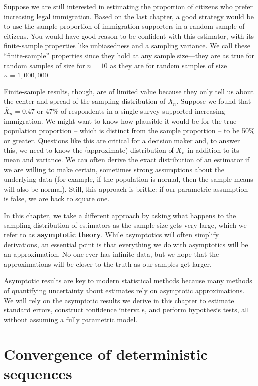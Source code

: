 \documentclass[
  13pt,
  letterpaper,
  DIV=11,
  numbers=noendperiod]{scrreprt}
\newcommand{\Xbar}{\overline{X}}
\theoremstyle{plain}
\theoremstyle{definition}
\theoremstyle{definition}
\theoremstyle{remark}
\begin{document}
Suppose we are still interested in estimating the proportion of citizens
who prefer increasing legal immigration. Based on the last chapter, a
good strategy would be to use the sample proportion of immigration
supporters in a random sample of citizens. You would have good reason to
be confident with this estimator, with its finite-sample properties like
unbiasedness and a sampling variance. We call these ``finite-sample''
properties since they hold at any sample size---they are as true for
random samples of size for \(n = 10\) as they are for random samples of
size \(n = 1,000,000\).

Finite-sample results, though, are of limited value because they only
tell us about the center and spread of the sampling distribution of
\(\Xbar_n\). Suppose we found that \(\Xbar_n = 0.47\) or 47\% of
respondents in a single survey supported increasing immigration. We
might want to know how plausible it would be for the true population
proportion -- which is distinct from the sample proportion -- to be 50\%
or greater. Questions like this are critical for a decision maker and,
to answer this, we need to know the (approximate) distribution of
\(\Xbar_n\) in addition to its mean and variance. We can often derive
the exact distribution of an estimator if we are willing to make
certain, sometimes strong assumptions about the underlying data (for
example, if the population is normal, then the sample means will also be
normal). Still, this approach is brittle: if our parametric assumption
is false, we are back to square one.

In this chapter, we take a different approach by asking what happens to
the sampling distribution of estimators as the sample size gets very
large, which we refer to as \textbf{asymptotic theory}. While
asymptotics will often simplify derivations, an essential point is that
everything we do with asymptotics will be an approximation. No one ever
has infinite data, but we hope that the approximations will be closer to
the truth as our samples get larger.

Asymptotic results are key to modern statistical methods because many
methods of quantifying uncertainty about estimates rely on asymptotic
approximations. We will rely on the asymptotic results we derive in this
chapter to estimate standard errors, construct confidence intervals, and
perform hypothesis tests, all without assuming a fully parametric model.

\section{Convergence of deterministic
sequences}\label{convergence-of-deterministic-sequences}
\end{document}
